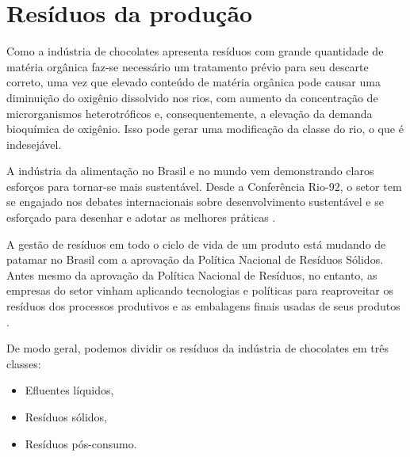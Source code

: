 \documentclass[
	12pt,				%
	openright,			%
	oneside,			%
	a4paper,			%
	english,			%
	french,				%
	spanish,			%
	brazil				%
	]{abntex2}
\begin{document}

\section{Resíduos da produção}

Como a indústria de chocolates apresenta resíduos com grande quantidade de matéria
orgânica faz-se necessário um tratamento prévio para seu descarte correto, uma vez que
elevado conteúdo de matéria orgânica pode causar uma diminuição do oxigênio dissolvido
nos rios, com aumento da concentração de microrganismos heterotróficos e,
consequentemente, a elevação da demanda bioquímica de oxigênio. Isso pode gerar uma
modificação da classe do rio, o que é indesejável.

A indústria da alimentação no Brasil e no mundo vem demonstrando claros esforços
para tornar-se mais sustentável. Desde a Conferência Rio-92, o setor tem se engajado nos
debates internacionais sobre desenvolvimento sustentável e se esforçado para desenhar e
adotar as melhores práticas \cite{CNI}.
 
A gestão de resíduos em todo o ciclo de vida de um produto está mudando de patamar
no Brasil com a aprovação da Política Nacional de Resíduos Sólidos. Antes mesmo da
aprovação da Política Nacional de Resíduos, no entanto, as empresas do setor vinham
aplicando tecnologias e políticas para reaproveitar os resíduos dos processos produtivos e as embalagens finais usadas de seus produtos \cite{CNI}.
 
De modo geral, podemos dividir os resíduos da indústria de chocolates em três classes:

\begin{itemize}
\item Efluentes líquidos,
\item Resíduos sólidos,
\item Resíduos pós-consumo.
\end{itemize}
\end{document}
